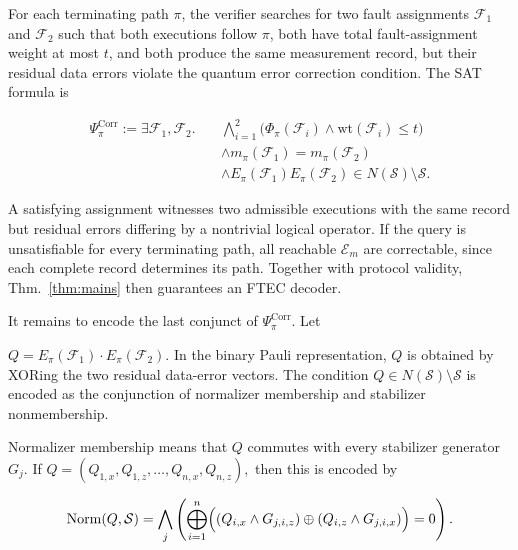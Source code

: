 \documentclass[acmsmall,screen,review,anonymous,nonacm]{acmart}
\newcommand{\cS}{\mathcal{S}}
\begin{document}
For each terminating path $\pi$, the verifier searches for two fault
assignments $\mathcal{F}_1$ and $\mathcal{F}_2$ such that both executions follow $\pi$, both have
total fault-assignment weight at most $t$, and both produce the same measurement record, but their
residual data errors violate the quantum error correction condition. The SAT
formula is

\begin{equation}
\begin{aligned}
\Psi^{\mathrm{Corr}}_\pi
:=\exists \mathcal F_1,\mathcal F_2.\quad
&\bigwedge_{i=1}^{2}\bigl(
  \Phi_\pi(\mathcal F_i)\land\mathrm{wt}(\mathcal F_i)\le t\bigr)\\
&\land m_\pi(\mathcal F_1)=m_\pi(\mathcal F_2)\\
&\land E_\pi(\mathcal F_1)E_\pi(\mathcal F_2)
  \in N(\cS)\setminus\cS.
\end{aligned}
\end{equation}

A satisfying assignment witnesses two admissible executions with the
same record but residual errors differing by a nontrivial logical operator.
If the query is unsatisfiable for every terminating path, all reachable
$\mathcal E_m$ are correctable, since each complete record determines its
path. Together with protocol validity, Thm.~\ref{thm:mains} then
guarantees an FTEC decoder.

It remains to encode the last conjunct of $\Psi^{\mathrm{Corr}}_\pi$. Let

$
Q=E_\pi(\mathcal{F}_1) \cdot E_\pi(\mathcal{F}_2).
$
In the binary Pauli representation, $Q$ is obtained by XORing the two residual
data-error vectors. The condition
$
Q\in N(\mathcal S)\setminus\mathcal S
$
is encoded as the conjunction of normalizer membership and stabilizer
nonmembership.

Normalizer membership means that $Q$ commutes with every stabilizer generator
$G_j$. If
$
Q=(Q_{1,x},Q_{1,z},\ldots,Q_{n,x},Q_{n,z}),
$
then this is encoded by

\begin{equation} \label{eq:Normalize-membership}
    \begin{aligned}
       \mathrm{Norm}(Q,\mathcal{S}) =  \bigwedge_j
\left(
\bigoplus_{i=1}^n
\Bigl(
(Q_{i,x} \land G_{j,i,z})
\oplus
(Q_{i,z} \land G_{j,i,x})
\Bigr)
=0
\right).
    \end{aligned}
\end{equation}
\end{document}
